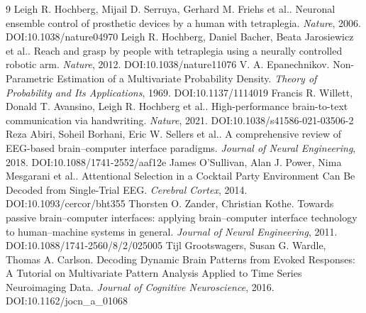 \documentclass[11pt]{article}
\begin{document}
\begin{thebibliography}{9}
 Leigh R. Hochberg, Mijail D. Serruya, Gerhard M. Friehs et al.. Neuronal ensemble control of prosthetic devices by a human with tetraplegia. \emph{Nature}, 2006. DOI:10.1038/nature04970
 Leigh R. Hochberg, Daniel Bacher, Beata Jarosiewicz et al.. Reach and grasp by people with tetraplegia using a neurally controlled robotic arm. \emph{Nature}, 2012. DOI:10.1038/nature11076
 V. A. Epanechnikov. Non-Parametric Estimation of a Multivariate Probability Density. \emph{Theory of Probability and Its Applications}, 1969. DOI:10.1137/1114019
 Francis R. Willett, Donald T. Avansino, Leigh R. Hochberg et al.. High-performance brain-to-text communication via handwriting. \emph{Nature}, 2021. DOI:10.1038/s41586-021-03506-2
 Reza Abiri, Soheil Borhani, Eric W. Sellers et al.. A comprehensive review of EEG-based brain–computer interface paradigms. \emph{Journal of Neural Engineering}, 2018. DOI:10.1088/1741-2552/aaf12e
 James O’Sullivan, Alan J. Power, Nima Mesgarani et al.. Attentional Selection in a Cocktail Party Environment Can Be Decoded from Single-Trial EEG. \emph{Cerebral Cortex}, 2014. DOI:10.1093/cercor/bht355
 Thorsten O. Zander, Christian Kothe. Towards passive brain–computer interfaces: applying brain–computer interface technology to human–machine systems in general. \emph{Journal of Neural Engineering}, 2011. DOI:10.1088/1741-2560/8/2/025005
 Tijl Grootswagers, Susan G. Wardle, Thomas A. Carlson. Decoding Dynamic Brain Patterns from Evoked Responses: A Tutorial on Multivariate Pattern Analysis Applied to Time Series Neuroimaging Data. \emph{Journal of Cognitive Neuroscience}, 2016. DOI:10.1162/jocn\_a\_01068
\end{thebibliography}
\end{document}
